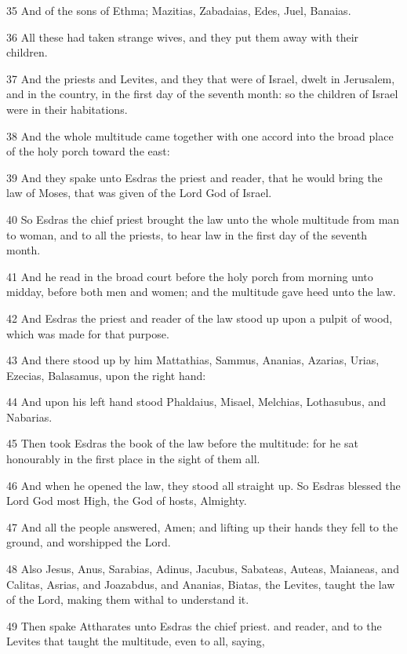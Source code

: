 \par 35 And of the sons of Ethma; Mazitias, Zabadaias, Edes, Juel, Banaias.
\par 36 All these had taken strange wives, and they put them away with their children.
\par 37 And the priests and Levites, and they that were of Israel, dwelt in Jerusalem, and in the country, in the first day of the seventh month: so the children of Israel were in their habitations.
\par 38 And the whole multitude came together with one accord into the broad place of the holy porch toward the east:
\par 39 And they spake unto Esdras the priest and reader, that he would bring the law of Moses, that was given of the Lord God of Israel.
\par 40 So Esdras the chief priest brought the law unto the whole multitude from man to woman, and to all the priests, to hear law in the first day of the seventh month.
\par 41 And he read in the broad court before the holy porch from morning unto midday, before both men and women; and the multitude gave heed unto the law.
\par 42 And Esdras the priest and reader of the law stood up upon a pulpit of wood, which was made for that purpose.
\par 43 And there stood up by him Mattathias, Sammus, Ananias, Azarias, Urias, Ezecias, Balasamus, upon the right hand:
\par 44 And upon his left hand stood Phaldaius, Misael, Melchias, Lothasubus, and Nabarias.
\par 45 Then took Esdras the book of the law before the multitude: for he sat honourably in the first place in the sight of them all.
\par 46 And when he opened the law, they stood all straight up. So Esdras blessed the Lord God most High, the God of hosts, Almighty.
\par 47 And all the people answered, Amen; and lifting up their hands they fell to the ground, and worshipped the Lord.
\par 48 Also Jesus, Anus, Sarabias, Adinus, Jacubus, Sabateas, Auteas, Maianeas, and Calitas, Asrias, and Joazabdus, and Ananias, Biatas, the Levites, taught the law of the Lord, making them withal to understand it.
\par 49 Then spake Attharates unto Esdras the chief priest. and reader, and to the Levites that taught the multitude, even to all, saying,
